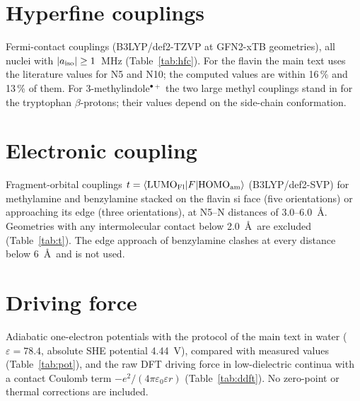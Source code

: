 \documentclass[11pt]{article}
\begin{document}
\section{Hyperfine couplings}
Fermi-contact couplings (B3LYP/def2-TZVP at GFN2-xTB geometries), all nuclei
with $|a_{\rm iso}|\ge1$~MHz (Table~\ref{tab:hfc}). For the flavin the main text
uses the literature values for N5 and N10;\cite{Lee2014} the computed values
are within 16\,\% and 13\,\% of them. For 3-methylindole$^{\bullet+}$ the two
large methyl couplings stand in for the tryptophan $\beta$-protons; their
values depend on the side-chain conformation.

\begin{table}[h]
\caption{Isotropic hyperfine couplings.}
\label{tab:hfc}
\centering

\end{table}

\section{Electronic coupling}
Fragment-orbital couplings $t = \langle{\rm LUMO_{Fl}}|F|{\rm HOMO_{am}}\rangle$
(B3LYP/def2-SVP) for methylamine and benzylamine stacked on the flavin si face
(five orientations) or approaching its edge (three orientations), at N5--N
distances of 3.0--6.0~\AA. Geometries with any intermolecular contact below
2.0~\AA\ are excluded (Table~\ref{tab:t}). The edge approach of benzylamine
clashes at every distance below 6~\AA\ and is not used.

\begin{table}[h]
\caption{Coupling scan. ``valid'': non-clashing geometries of those computed.}
\label{tab:t}
\centering

\end{table}

\section{Driving force}
Adiabatic one-electron potentials with the protocol of the main text in water
($\varepsilon = 78.4$, absolute SHE potential 4.44~V\cite{Jonsson1996}), compared
with measured values\cite{Jonsson1996,Mayhew1999} (Table~\ref{tab:pot}), and
the raw DFT driving force in low-dielectric continua with a contact
Coulomb term $-e^2/(4\pi\varepsilon_0\varepsilon r)$ (Table~\ref{tab:ddft}).
No zero-point or thermal corrections are included.

\begin{table}[h]
\caption{One-electron potentials in water.}
\label{tab:pot}
\centering

\end{table}
\end{document}
